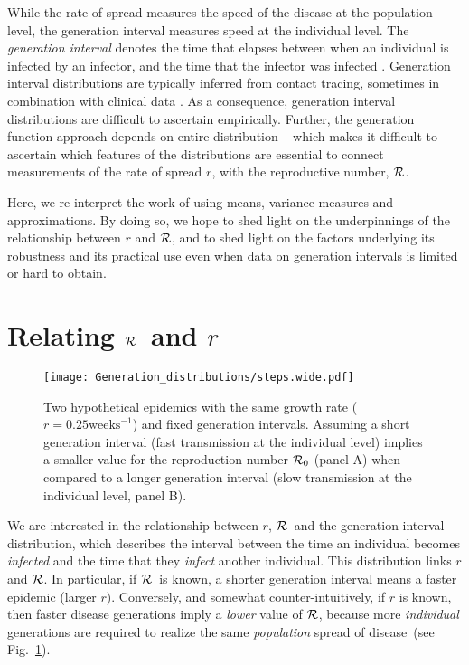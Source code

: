 \documentclass[12pt,]{article}
\newcommand{\RR}{\ensuremath{{\cal R}}}
\newcommand{\Rx}[1]{\ensuremath{{\cal R}_{#1}}}
\newcommand{\Ro}{\Rx{0}}
\newcommand{\fref}[1]{Fig.~\ref{fig:#1}}
\begin{document}
While the rate of spread measures the speed of the disease at the population level, the generation interval measures speed at the individual level.
The \emph{generation interval} denotes the time that elapses between when an individual is infected by an infector, and the time that the infector was infected \cite{Sven07}.
Generation interval distributions are typically inferred from contact tracing, sometimes in combination with clinical data \cite{GenerationMeasurement}.
As a consequence, generation interval distributions are difficult to ascertain empirically. Further, the generation function approach depends on entire distribution -- which makes it difficult to ascertain which features of the distributions are essential to connect measurements of the rate of spread $r$, with the reproductive number, \RR.

Here, we re-interpret the work of \cite{WallLips07} using means, variance measures and approximations.
By doing so, we hope to shed light on the underpinnings of the relationship between $r$ and \RR, and to shed light on the factors underlying its robustness and its practical use even when data on generation intervals is limited or hard to obtain.

\section{Relating \RR\ and $r$}

\begin{figure}[htbp] \centering
	\texttt{[image: Generation\_distributions/steps.wide.pdf]}
	\caption{Two hypothetical epidemics with the same growth rate ($r=0.25 \mathrm{weeks}^{-1}$) and fixed generation intervals.  Assuming a short generation interval (fast transmission at the individual level) implies a smaller value for the reproduction number $\Ro$ (panel A) when compared to a longer generation interval (slow transmission at the individual level, panel B). 
	\label{fig:link}}
\end{figure}

We are interested in the relationship between $r$, \RR~and the generation-interval distribution, which describes the interval between the time an individual becomes \emph{infected} and the time that they \emph{infect} another individual.
This distribution links $r$ and \RR. In particular, if \RR~is known, a shorter generation interval means a faster epidemic (larger $r$). Conversely, and somewhat counter-intuitively, if $r$ is known, then faster disease generations imply a \emph{lower} value of \RR, because more \emph{individual} generations are required to realize the same \emph{population} spread of disease~(see \fref{link}).
\end{document}
